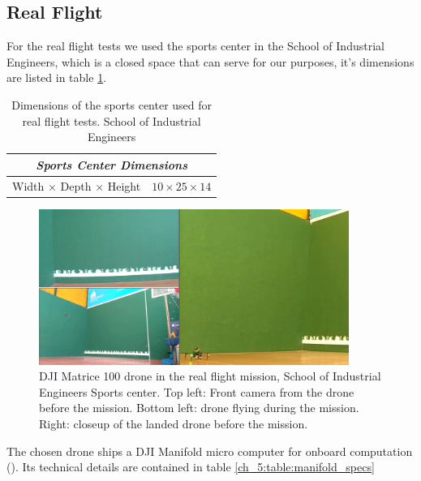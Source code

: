   \subsection{Real Flight} \label{ch_5:subsect:exp_real_flight}

    For the real flight tests we used the sports center in the School of Industrial Engineers, which is a closed space that can serve for our purposes, it's dimensions are listed in table \ref{ch_5:table:sports_dims}.

    \begin{table}[!h]
      \centering
      \begin{tabular}{lr} \toprule
        \multicolumn{2}{c}{\textit{Sports Center Dimensions}}        \\ \midrule
        Width $\times$ Depth $\times$ Height & $10 \times 25 \times 14$ \\ \bottomrule
        \hline
      \end{tabular}
      \caption{Dimensions of the sports center used for real flight tests. School of Industrial Engineers}
      \label{ch_5:table:sports_dims}
    \end{table}

    \begin{figure}
      \centering
      \includegraphics[width=0.9\textwidth,height=0.5\textheight,keepaspectratio]{./Figures/RealFlight.png}
      \caption{DJI Matrice 100 drone in the real flight mission, School of Industrial Engineers Sports center. Top left: Front camera from the drone before the mission. Bottom left: drone flying during the mission. Right: closeup of the landed drone before the mission.}
      \label{ch_5:fig:full_realflight}
    \end{figure}


    The chosen drone ships a DJI Manifold micro computer for onboard computation (\cite{dji_manifold_web}). Its technical details are contained in table \ref{ch_5:table:manifold_specs}

